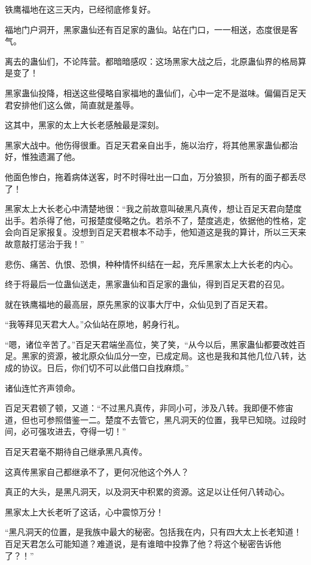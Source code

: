 \begin{this_body}
铁鹰福地在这三天内，已经彻底修复好。

福地门户洞开，黑家蛊仙还有百足家的蛊仙。站在门口，一一相送，态度很是客气。

离去的蛊仙们，不论阵营。都暗暗感叹：这场黑家大战之后，北原蛊仙界的格局算是变了！

黑家蛊仙投降，相送这些侵略自家福地的蛊仙们，心中一定不是滋味。偏偏百足天君安排他们这么做，简直就是羞辱。

这其中，黑家的太上大长老感触最是深刻。

黑家大战中。他伤得很重。百足天君亲自出手，施以治疗，将其他黑家蛊仙都治好，惟独遗漏了他。

他面色惨白，拖着病体送客，时不时得吐出一口血，万分狼狈，所有的面子都丢尽了！

黑家太上大长老心中清楚地很：“我之前故意叫破黑凡真传，想让百足天君向楚度出手。若杀得了他，可报楚度侵略之仇。若杀不了，楚度逃走，依据他的性格，定会向百足家报复。没想到百足天君根本不动手，他知道这是我的算计，所以三天来故意敲打惩治于我！”

悲伤、痛苦、仇恨、恐惧，种种情怀纠结在一起，充斥黑家太上大长老的内心。

终于将最后一位蛊仙送走，黑家蛊仙和百足家的蛊仙，得到百足天君的召见。

就在铁鹰福地的最高层，原先黑家的议事大厅中，众仙见到了百足天君。

“我等拜见天君大人。”众仙站在原地，躬身行礼。

“嗯，诸位辛苦了。”百足天君端坐高位，笑了笑，“从今以后，黑家蛊仙都要改姓百足。黑家的资源，被北原众仙瓜分一空，已成定局。这也是我和其他几位八转，达成的协议。日后，你们切不可以此借口自找麻烦。”

诸仙连忙齐声领命。

百足天君顿了顿，又道：“不过黑凡真传，非同小可，涉及八转。我即便不修宙道，但也可参照借鉴一二。楚度不去管它，黑凡洞天的位置，我早已知晓。过段时间，必可强攻进去，夺得一切！”

百足天君毫不期待自己继承黑凡真传。

这真传黑家自己都继承不了，更何况他这个外人？

真正的大头，是黑凡洞天，以及洞天中积累的资源。这足以让任何八转动心。

黑家太上大长老听了这话，心中震惊万分！

“黑凡洞天的位置，是我族中最大的秘密。包括我在内，只有四大太上长老知道！百足天君怎么可能知道？难道说，是有谁暗中投靠了他？将这个秘密告诉他了？！”


\end{this_body}
